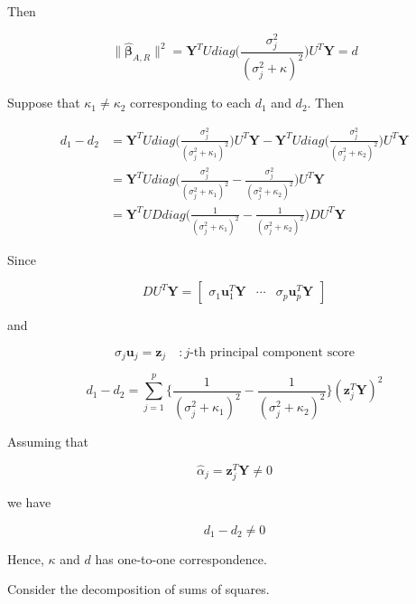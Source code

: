 \documentclass[]{book}
\theoremstyle{definition}
\theoremstyle{definition}
\theoremstyle{definition}
\theoremstyle{remark}
\begin{document}
Then

\begin{equation}
  \lVert \boldsymbol{\hat\beta}_{A, R} \rVert^2 = \mathbf{Y}^T U diag\bigg( \frac{\sigma_j^2}{(\sigma_j^2 + \kappa)^2} \bigg) U^T \mathbf{Y} = d
  \label{eq:dvskappa}
\end{equation}

Suppose that \(\kappa_1 \neq \kappa_2\) corresponding to each \(d_1\) and \(d_2\). Then

\begin{equation*}
  \begin{split}
    d_1 - d_2 & = \mathbf{Y}^T U diag\bigg( \frac{\sigma_j^2}{(\sigma_j^2 + \kappa_1)^2} \bigg) U^T \mathbf{Y} - \mathbf{Y}^T U diag\bigg( \frac{\sigma_j^2}{(\sigma_j^2 + \kappa_2)^2} \bigg) U^T \mathbf{Y} \\
    & = \mathbf{Y}^T U diag\bigg( \frac{\sigma_j^2}{(\sigma_j^2 + \kappa_1)^2} - \frac{\sigma_j^2}{(\sigma_j^2 + \kappa_2)^2} \bigg) U^T \mathbf{Y} \\
    & = \mathbf{Y}^T UD diag\bigg( \frac{1}{(\sigma_j^2 + \kappa_1)^2} - \frac{1}{(\sigma_j^2 + \kappa_2)^2} \bigg) D U^T \mathbf{Y}
  \end{split}
\end{equation*}

Since

\[DU^T \mathbf{Y} = \begin{bmatrix} \sigma_1 \mathbf{u}_1^T \mathbf{Y} & \cdots & \sigma_p \mathbf{u}_p^T \mathbf{Y} \end{bmatrix}\]

and

\[\sigma_j \mathbf{u}_j = \mathbf{z}_j \quad : j\text{-th principal component score}\]

\[d_1 - d_2 = \sum_{j = 1}^p \bigg\{ \frac{1}{(\sigma_j^2 + \kappa_1)^2} - \frac{1}{(\sigma_j^2 + \kappa_2)^2} \bigg\} (\mathbf{z}_j^T \mathbf{Y})^2\]

Assuming that

\[\hat\alpha_j = \mathbf{z}_j^T \mathbf{Y} \neq 0\]

we have

\[d_1 - d_2 \neq 0\]

Hence, \(\kappa\) and \(d\) has one-to-one correspondence.

Consider the decomposition of sums of squares.
\end{document}
